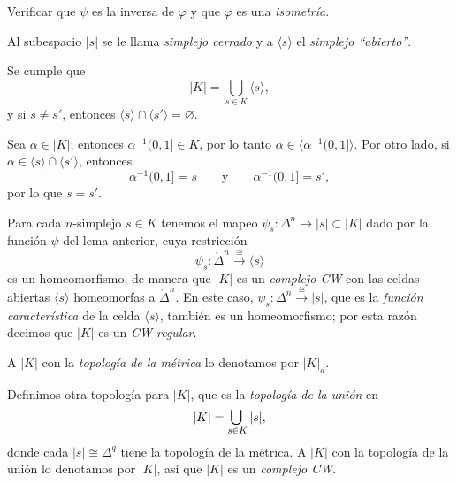 \begin{ejercicio}
Verificar que $\psi$ es la inversa de $\varphi$ y que $\varphi$ es una \textit{isometría}.
\end{ejercicio}

\begin{definicion}
Al subespacio $|s|$ se le llama \textit{simplejo cerrado} y a $\langle s \rangle$ el \textit{simplejo ``abierto''}.
\end{definicion}
\begin{lema}
Se cumple que
\[
|K| = \bigcup_{s \in K} \langle s \rangle,
\]
y si $s \neq s'$, entonces $\langle s \rangle \cap \langle s' \rangle = \varnothing$.
\end{lema}

\begin{dem}
Sea $\alpha \in |K|$; entonces $\alpha^{-1}(0, 1] \in K$, por lo tanto $\alpha \in \big\langle \alpha^{-1}(0, 1] \big\rangle$. Por otro lado, si $\alpha \in \langle s \rangle \cap \langle s' \rangle$, entonces
\[
\alpha^{-1}(0, 1] = s \qquad \text{y} \qquad \alpha^{-1}(0, 1] = s',
\]
por lo que $s = s'$.
\end{dem}

\begin{nota}
Para cada $n$-simplejo $s \in K$ tenemos el mapeo $\psi_s \colon \Delta^n \to |s| \subset |K|$ dado por la función $\psi$ del lema anterior, cuya restricción
\[
\psi_s \colon \mathring{\Delta}^n \xrightarrow{\;\cong\;} \langle s \rangle
\]
es un homeomorfismo, de manera que $|K|$ es un \textit{complejo CW} con las celdas abiertas $\langle s \rangle$ homeomorfas a $\mathring{\Delta}^n$. En este caso, $\psi_s \colon \Delta^n \xrightarrow{\;\cong\;} |s|$, que es la \textit{función característica} de la celda $\langle s \rangle$, también es un homeomorfismo; por esta razón decimos que $|K|$ es un \textit{CW regular}.
\end{nota}

\begin{definicion}
A $|K|$ con la \textit{topología de la métrica} lo denotamos por $|K|_d$.
\end{definicion}

\begin{definicion}
Definimos otra topología para $|K|$, que es la \textit{topología de la unión} en
\[
|K| = \medcup_{s \in K} |s|,
\]
donde cada $|s| \cong \Delta^q$ tiene la topología de la métrica. A $|K|$ con la topología de la unión lo denotamos por $|K|$, así que $|K|$ es un \textit{complejo CW}.
\end{definicion}

